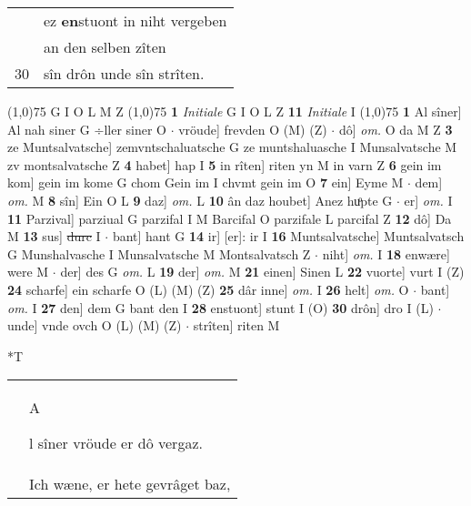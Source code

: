 \documentclass[8pt,a4paper,notitlepage]{article}
\begin{document}
\begin{table}[ht]
\begin{minipage}[t]{0.5\linewidth}
\begin{tabular}{rl}
 & ez \textbf{en}stuont in niht vergeben\\ 
 & an den selben zîten\\ 
30 & sîn drôn unde sîn strîten.\\ 
\end{tabular}
\scriptsize
\line(1,0){75} \newline
G I O L M Z \newline
\line(1,0){75} \newline
\textbf{1} \textit{Initiale} G I O L Z  \textbf{11} \textit{Initiale} I  \newline
\line(1,0){75} \newline
\textbf{1} Al sîner] Al nah siner G ÷ller siner O  $\cdot$ vröude] frevden O (M) (Z)  $\cdot$ dô] \textit{om.} O da M Z \textbf{3} ze Muntsalvatsche] zemvntschaluatsche G ze muntshaluasche I Munsalvatsche M zv montsalvatsche Z \textbf{4} habet] hap I \textbf{5} in rîten] riten yn M in varn Z \textbf{6} gein im kom] gein im kome G chom Gein im I chvmt gein im O \textbf{7} ein] Eyme M  $\cdot$ dem] \textit{om.} M \textbf{8} sîn] Ein O L \textbf{9} daz] \textit{om.} L \textbf{10} ân daz houbet] Anez huͦpte G  $\cdot$ er] \textit{om.} I \textbf{11} Parzival] parziual G parzifal I M Barcifal O parzifale L parcifal Z \textbf{12} dô] Da M \textbf{13} sus] \sout{durc} I  $\cdot$ bant] hant G \textbf{14} ir] [er]: ir I \textbf{16} Muntsalvatsche] Muntsalvatsch G Munshalvasche I Munsalvatsche M Montsalvatsch Z  $\cdot$ niht] \textit{om.} I \textbf{18} enwære] were M  $\cdot$ der] des G \textit{om.} L \textbf{19} der] \textit{om.} M \textbf{21} einen] Sinen L \textbf{22} vuorte] vurt I (Z) \textbf{24} scharfe] ein scharfe O (L) (M) (Z) \textbf{25} dâr inne] \textit{om.} I \textbf{26} helt] \textit{om.} O  $\cdot$ bant] \textit{om.} I \textbf{27} den] dem G bant den I \textbf{28} enstuont] stunt I (O) \textbf{30} drôn] dro I (L)  $\cdot$ unde] vnde ovch O (L) (M) (Z)  $\cdot$ strîten] riten M \newline
\end{minipage}
\hspace{0.5cm}
\begin{minipage}[t]{0.5\linewidth}
\small
\begin{center}*T
\end{center}
\begin{tabular}{rl}
 & \begin{large}A\end{large}l sîner vröude er dô vergaz.\\ 
 & Ich wæne, er hete gevrâget baz,\\ 

\end{tabular}
\end{minipage}
\end{table}
\end{document}
